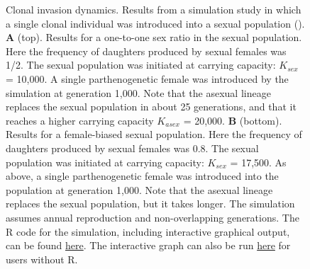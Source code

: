 \documentclass[
  letterpaper,
]{book}
\begin{document}
\begin{figure}


\caption[Clonal invasion dynamics]{\label{fig-1.2}Clonal invasion
dynamics. Results from a simulation study in which a single clonal
individual was introduced into a sexual population
(). \textbf{A} (top). Results for
a one-to-one sex ratio in the sexual population. Here the frequency of
daughters produced by sexual females was 1/2. The sexual population was
initiated at carrying capacity: \(K_{sex}\) = 10,000. A single
parthenogenetic female was introduced by the simulation at generation
1,000. Note that the asexual lineage replaces the sexual population in
about 25 generations, and that it reaches a higher carrying capacity
\(K_{asex}\) = 20,000. \textbf{B} (bottom). Results for a female-biased
sexual population. Here the frequency of daughters produced by sexual
females was 0.8. The sexual population was initiated at carrying
capacity: \(K_{sex}\) = 17,500. As above, a single parthenogenetic
female was introduced into the population at generation 1,000. Note that
the asexual lineage replaces the sexual population, but it takes longer.
The simulation assumes annual reproduction and non-overlapping
generations. The R code for the simulation, including interactive
graphical output, can be found
\href{https://raw.githubusercontent.com/IULibScholComm/through-the-looking-glass/main/sim\%20for\%20fig\%201.2(ZMD).R}{here}.
The interactive graph can also be run
\href{https://connect.posit.iu.edu/clonal-invasion-dynamics/}{here} for
users without R.}

\end{figure}%
\end{document}
